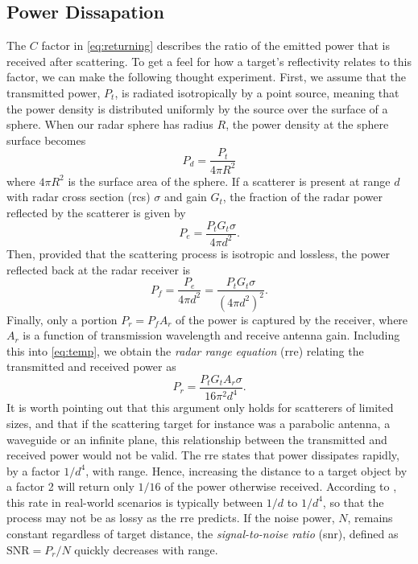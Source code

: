 \subsection{Power Dissapation}

The $C$ factor in \eqref{eq:returning} describes the ratio of the emitted power that is received after scattering. To get a feel for how a target's reflectivity relates to this factor, we can make the following thought experiment. First, we assume that the transmitted power, $P_t$, is radiated isotropically by a point source, meaning that the power density is distributed uniformly by the source over the surface of a sphere. When our radar sphere has radius $R$, the power density at the sphere surface becomes  \citep{amin_2017}
\begin{equation}
	P_d 
	= \frac{P_t}{4\pi R^2}
\end{equation}
where $4\pi R^2$ is the surface area of the sphere. If a scatterer is present at range $d$ with radar cross section (\gls{rcs}) $\sigma$ and gain $G_t$, the fraction of the radar power reflected by the scatterer is given by 
\begin{equation}
	P_{e}
	= \frac{P_tG_t\sigma}{4\pi d^2}.
\end{equation}
Then, provided that the scattering process is isotropic and lossless, the power reflected back at the radar receiver is
\begin{equation}\label{eq:temp}
	P_f 
	= \frac{P_e}{4\pi d^2} 
	= \frac{P_t G_t \sigma}{(4\pi d^2)^2}.
\end{equation}
Finally, only a portion $P_r = P_fA_r$ of the power is captured by the receiver, where $A_r$ is a function of transmission wavelength and receive antenna gain. Including this into \eqref{eq:temp}, we obtain the \emph{radar range equation} (\gls{rre}) relating the transmitted and received power as
\begin{equation}
	P_r
	= \frac{P_t G_t A_r \sigma}{16\pi^2 d^4}.
\end{equation}
It is worth pointing out that this argument only holds for scatterers of limited sizes, and that if the scattering target for instance was a parabolic antenna, a waveguide or an infinite plane, this relationship between the transmitted and received power would not be valid. The \gls{rre} states that power dissipates rapidly, by a factor $1/d^4$, with range. Hence, increasing the distance to a target object by a factor 2 will return only $1/16$ of the power otherwise received. According to \citep{richards_2014}, this rate in real-world scenarios is typically between $1/d$ to $1/d^4$, so that the process may not be as lossy as the \gls{rre} predicts. If the noise power, $N$, remains constant regardless of target distance, the \emph{signal-to-noise ratio} (\gls{snr}), defined as $\text{SNR} = P_r/N$ quickly decreases with range. 

